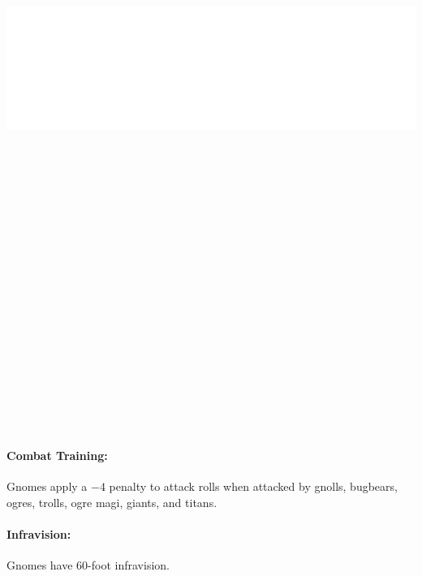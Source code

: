 \begin{multicols}{2}
\noindent\includegraphics[width=\columnwidth, height=9.25in]{testblock.pdf}  
 
\paragraph{Combat Training:} Gnomes apply a $-4$ penalty to attack rolls when attacked by gnolls, bugbears, ogres, trolls, ogre magi, giants, and titans.  

\paragraph{Infravision:} Gnomes have 60-foot infravision.


\end{multicols}
